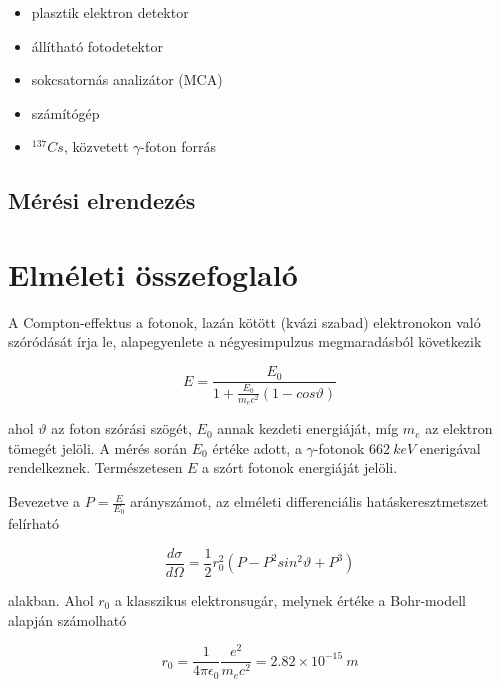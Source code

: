 \documentclass[a4paper,12pt]{article}
\begin{document}
\begin{itemize}
\item plasztik elektron detektor
\item állítható fotodetektor
\item sokcsatornás analizátor (MCA)
\item számítógép
\item $^{137}Cs$, közvetett $\gamma$-foton forrás
\end{itemize}

\subsection{Mérési elrendezés}



\vspace{2cm}

\section{Elméleti összefoglaló}

\par A Compton-effektus a fotonok, lazán kötött (kvázi szabad) elektronokon való szóródását írja le, alapegyenlete a négyesimpulzus megmaradásból következik

\begin{equation*}
	E = \frac{E_{0}}{1 + \frac{E_{0}}{m_{e}c^{2}}(1 - cos\vartheta)}	
\end{equation*}

ahol $\vartheta$ az foton szórási szögét, $E_{0}$ annak kezdeti energiáját, míg $m_{e}$ az elektron tömegét jelöli. A mérés során $E_{0}$ értéke adott, a $\gamma$-fotonok $662~keV$ enerigával rendelkeznek. Természetesen $E$ a szórt fotonok energiáját jelöli.
\par Bevezetve a $P = \frac{E}{E_{0}}$ arányszámot, az elméleti differenciális hatáskeresztmetszet felírható

\begin{equation*}
	\frac{d\sigma}{d\Omega} = \frac{1}{2}r_{0}^{2}(P - P^{2}sin^{2}\vartheta + P^{3})
\end{equation*}

alakban. Ahol $r_{0}$ a klasszikus elektronsugár, melynek értéke a Bohr-modell alapján számolható

\begin{equation*}
	r_{0} = \frac{1}{4\pi\epsilon_{0}}\frac{e^{2}}{m_{e}c^{2}} = 2.82 \times 10^{-15} ~m
\end{equation*}
\end{document}
